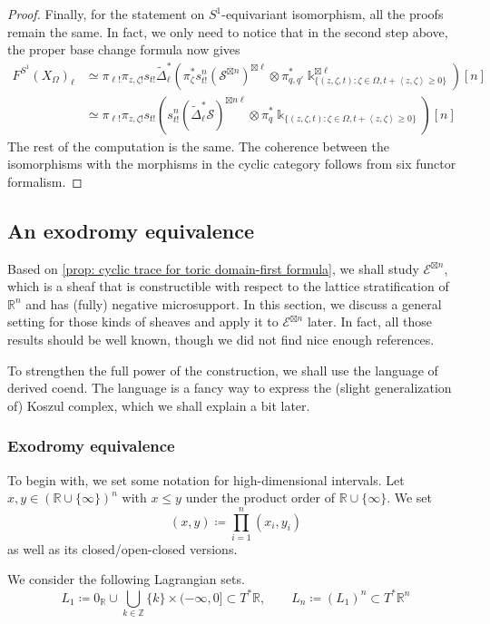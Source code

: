 \documentclass[11pt]{amsart}
\numberwithin{equation}{section}
\theoremstyle{plain}
\theoremstyle{definition}
\theoremstyle{remark}
\newcommand{\bZ} { {\mathbb{Z}}}
\newcommand{\bR} { {\mathbb{R}}}
\newcommand{\cE} { {\mathcal{E}}}
\begin{document}
\begin{proof}
Finally, for the statement on $S^1$-equivariant isomorphism, all the proofs remain the same. In fact, we only need to notice that in the second step above, the proper base change formula now gives
\begin{align*}
F^{S^1}(X_\Omega)_\ell &\simeq \pi_{\ell!}\pi_{z,\zeta!}s_{t!}\widetilde\Delta_\ell^*(\pi_\zeta^*s^n_{t!}(\mathcal{S}^{\boxtimes n})^{\boxtimes \ell} \otimes \pi_{q,q'}^*\Bbbk _{\{(z,\zeta,t): \zeta \in \Omega, t+\left<z,\zeta \right> \geq 0\}}^{\boxtimes \ell})[n]\\
&\simeq \pi_{\ell!}\pi_{z,\zeta!}s_{t!}(s_{t!}^n(\widetilde\Delta_\ell^*\mathcal{S})^{\boxtimes n\ell} \otimes \pi_q^*\Bbbk _{\{(z,\zeta,t): \zeta \in \Omega, t+\left<z,\zeta \right> \geq 0\}})[n]
\end{align*}
The rest of the computation is the same. The coherence between the isomorphisms with the morphisms in the cyclic category follows from six functor formalism.
\end{proof}

\subsection{An exodromy equivalence}\label{section: lattice sheaf general view}
Based on \autoref{prop: cyclic trace for toric domain-first formula}, we shall study $\cE^{\boxtimes n} $, which is a sheaf that is constructible with respect to the lattice stratification of $\bR^n$ and has (fully) negative microsupport. In this section, we discuss a general setting for those kinds of sheaves and apply it to $\cE^{\boxtimes n} $ later. In fact, all those results should be well known, though we did not find nice enough references. 

To strengthen the full power of the construction, we shall use the language of derived coend. The language is a fancy way to express the (slight generalization of) Koszul complex, which we shall explain a bit later. 

\subsubsection{Exodromy equivalence}
To begin with, we set some notation for high-dimensional intervals. Let $x,y\in (\bR\cup\{\infty\})^n$ with $x\leq y$ under the product order of $\bR\cup\{\infty\}$. We set 
\[ (x,y)\coloneqq \prod_{i=1}^n(x_i,y_i)\]
as well as its closed/open-closed versions. 

We consider the following Lagrangian sets.
\[L_1\coloneqq  0_\bR\cup \bigcup_{k\in\bZ} \{k\}\times (-\infty,0] \subset T^*\bR,\qquad L_n\coloneqq (L_1)^n\subset T^*\bR^n\]
\end{document}
